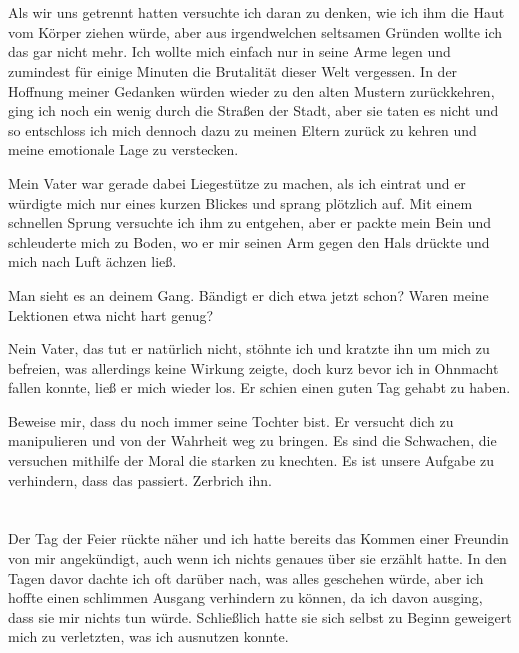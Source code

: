 \documentclass[11pt, a5paper]{article}
\begin{document}
\begin{spacing}{1.2}
		\section{}
		Als wir uns getrennt hatten versuchte ich daran zu denken, wie ich ihm die Haut vom Körper ziehen würde, aber aus irgendwelchen seltsamen Gründen wollte ich das gar nicht mehr. Ich wollte mich einfach nur in seine Arme legen und zumindest für einige Minuten die Brutalität dieser Welt vergessen. In der Hoffnung meiner Gedanken würden wieder zu den alten Mustern zurückkehren, ging ich noch ein wenig durch die Straßen der Stadt, aber sie taten es nicht und so entschloss ich mich dennoch dazu zu meinen Eltern zurück zu kehren und meine emotionale Lage zu verstecken.
		
		Mein Vater war gerade dabei Liegestütze zu machen, als ich eintrat und er würdigte mich nur eines kurzen Blickes und sprang plötzlich auf. Mit einem schnellen Sprung versuchte ich ihm zu entgehen, aber er packte mein Bein und schleuderte mich zu Boden, wo er mir seinen Arm gegen den Hals drückte und mich nach Luft ächzen ließ.
		
		\frqq Man sieht es an deinem Gang. Bändigt er dich etwa jetzt schon? Waren meine Lektionen etwa nicht hart genug?\flqq
		
		\frqq Nein Vater, das tut er natürlich nicht\flqq , stöhnte ich und kratzte ihn um mich zu befreien, was allerdings keine Wirkung zeigte, doch kurz bevor ich in Ohnmacht fallen konnte, ließ er mich wieder los. Er schien einen guten Tag gehabt zu haben.
		
		\frqq Beweise mir, dass du noch immer seine Tochter bist. Er versucht dich zu manipulieren und von der Wahrheit weg zu bringen. Es sind die Schwachen, die versuchen mithilfe der Moral die starken zu knechten. Es ist unsere Aufgabe zu verhindern, dass das passiert. Zerbrich ihn.\flqq\newpage
		
		\section{}
		Der Tag der Feier rückte näher und ich hatte bereits das Kommen einer Freundin von mir angekündigt, auch wenn ich nichts genaues über sie erzählt hatte. In den Tagen davor dachte ich oft darüber nach, was alles geschehen würde, aber ich hoffte einen schlimmen Ausgang verhindern zu können, da ich davon ausging, dass sie mir nichts tun würde. Schließlich hatte sie sich selbst zu Beginn geweigert mich zu verletzten, was ich ausnutzen konnte.
		

\end{spacing}
\end{document}
